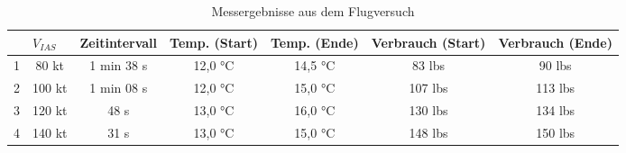 \begin{table}[h]
	\begin{tabular}{|c|c|c|c|c|c|c|}
		\hline
		& \multicolumn{1}{l|}{\textbf{$V_{IAS}$}} & \multicolumn{1}{l|}{\textbf{Zeitintervall}} & \multicolumn{1}{l|}{\textbf{Temp. (Start)}} & \multicolumn{1}{l|}{\textbf{Temp. (Ende)}} & \multicolumn{1}{l|}{\textbf{Verbrauch (Start)}} & \multicolumn{1}{l|}{\textbf{Verbrauch (Ende)}} \\ \hline
		1 & 80 kt          & 1 min 38 s         & 12,0 °C         & 14,5 °C       & 83 lbs        & 90 lbs    \\ \hline
		2 & 100 kt         & 1 min 08 s         & 12,0 °C         & 15,0 °C       & 107 lbs       & 113 lbs   \\ \hline
		3 & 120 kt         & 48 s               & 13,0 °C         & 16,0 °C       & 130 lbs       & 134 lbs   \\ \hline
		4 & 140 kt         & 31 s               & 13,0  °C        & 15,0 °C       & 148 lbs       & 150 lbs   \\ \hline
	\end{tabular}
	\caption{Messergebnisse aus dem Flugversuch} \label{tab:messergebnisse}
\end{table}

\newpage
